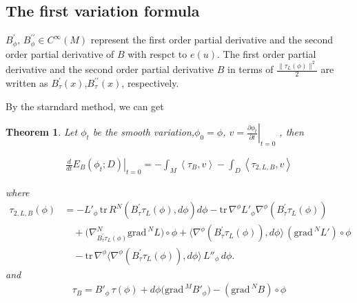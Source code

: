 \documentclass[12pt,UTF8]{article}
\theoremstyle{plain}
\newtheorem{thm}{Theorem}[section]
\theoremstyle{definition}
\renewcommand{\(}{\left(}
\renewcommand{\)}{\right)}
\DeclareMathOperator{\tr}{tr}
\DeclareMathOperator*{\grad}{grad}
\def\grad{\mathrm{grad\, }}
\def\tr{\mathrm{tr\, }}
\numberwithin{equation}{subsection}
\newcommand{\tr}{\mbox{tr}}
\renewcommand{\(}{\left(}
\renewcommand{\)}{\right)}
\numberwithin{equation}{section}
\begin{document}
\subsection{The first variation formula}

$B^\prime_\phi,\, B^{\prime\prime}_\phi\in C^\infty(M)$ represent the first order partial derivative and the second order   partial derivative of $B$ with respct to $e(u)$. The first order partial derivative and the second order   partial derivative $B$ in terms of  $\frac{\|\tau_L(\phi)\|^2}{2}$  are written as  $
B^\prime_\tau(x)$,$B^{\prime\prime}_\tau(x)$, respectively.


By the starndard method, we can get


\begin{thm} Let $\phi_t$ be the smooth variation,$\phi_0=\phi$, 
	$v = \left.\frac{\partial\phi_t}{\partial t}\right|_{t=0}$ , then
	
	\begin{equation}
		\begin{split}
			\left.\frac{d}{dt}E_{B}(\phi_t;D)\right|_{t=0}	=-\int_M \left\langle \tau_B,v \right\rangle-\int_D \left\langle \tau_{2,L,B} ,v \right\rangle
		\end{split}
	\end{equation}
	
	where  \begin{equation}
		\begin{split}
			\tau_{2,L,B}(\phi)
			&= -L'_\phi\,\tr R^N(B^\prime_\tau\tau_L(\phi),d\phi)d\phi
			- \tr\nabla^\phi L'_\phi\nabla^\phi\left(  B^\prime_\tau\tau_L(\phi)  \right)\\
			&\quad + \bigl(\nabla^N_{B^\prime_\tau\tau_L(\phi)}\grad^N L\bigr)\circ\phi
			+ \langle\nabla^\phi \left( B^\prime_\tau\tau_L(\phi) \right),d\phi\rangle\,(\grad^N L')\circ\phi \\
			&\quad - \tr\nabla^\phi\langle\nabla^\phi\left(B^\prime_\tau \tau_L(\phi) \right),d\phi\rangle\,L''_\phi\,d\phi.
		\end{split}
	\end{equation}
	and
	\begin{equation}
		\begin{split}
			\tau_B=	B'_\phi\,\tau(\phi) + d\phi\!\bigl(\grad^M B'_\phi\bigr) - (\grad^N B)\circ\phi
		\end{split}
	\end{equation}	
	
	
\end{thm}
\end{document}
